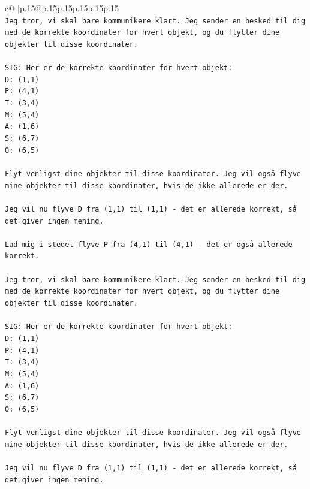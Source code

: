 \documentclass{article}
\begin{document}
{\begin{supertabular}{c@{$\;$}|p{.15\linewidth}@{}p{.15\linewidth}p{.15\linewidth}p{.15\linewidth}p{.15\linewidth}p{.15\linewidth}}
{{{\\ 
\texttt{Jeg tror, vi skal bare kommunikere klart. Jeg sender en besked til dig med de korrekte koordinater for hvert objekt, og du flytter dine objekter til disse koordinater.} \\
\\ 
\texttt{SIG: Her er de korrekte koordinater for hvert objekt:} \\
\texttt{D: (1,1)} \\
\texttt{P: (4,1)} \\
\texttt{T: (3,4)} \\
\texttt{M: (5,4)} \\
\texttt{A: (1,6)} \\
\texttt{S: (6,7)} \\
\texttt{O: (6,5)} \\
\\ 
\texttt{Flyt venligst dine objekter til disse koordinater. Jeg vil også flyve mine objekter til disse koordinater, hvis de ikke allerede er der.} \\
\\ 
\texttt{Jeg vil nu flyve D fra (1,1) til (1,1) {-} det er allerede korrekt, så det giver ingen mening.} \\
\\ 
\texttt{Lad mig i stedet flyve P fra (4,1) til (4,1) {-} det er også allerede korrekt.} \\
\\ 
\texttt{Jeg tror, vi skal bare kommunikere klart. Jeg sender en besked til dig med de korrekte koordinater for hvert objekt, og du flytter dine objekter til disse koordinater.} \\
\\ 
\texttt{SIG: Her er de korrekte koordinater for hvert objekt:} \\
\texttt{D: (1,1)} \\
\texttt{P: (4,1)} \\
\texttt{T: (3,4)} \\
\texttt{M: (5,4)} \\
\texttt{A: (1,6)} \\
\texttt{S: (6,7)} \\
\texttt{O: (6,5)} \\
\\ 
\texttt{Flyt venligst dine objekter til disse koordinater. Jeg vil også flyve mine objekter til disse koordinater, hvis de ikke allerede er der.} \\
\\ 
\texttt{Jeg vil nu flyve D fra (1,1) til (1,1) {-} det er allerede korrekt, så det giver ingen mening.} \\
}}}
\end{supertabular}}
\end{document}
